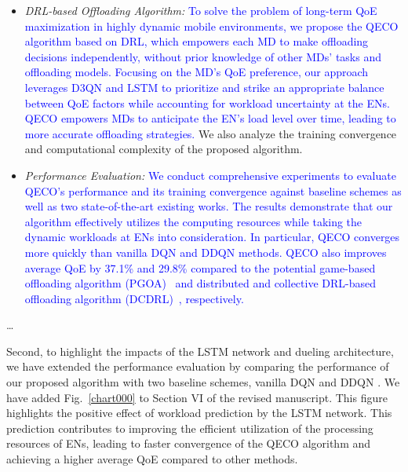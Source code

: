 \documentclass[12pt,draftclsnofoot,onecolumn]{IEEEtran}
\newenvironment{my}[2]%
{\begin{list}{}%
{\setlength{\rightmargin}{#1}\setlength{\leftmargin}{#2}}%


 \item[]{}

} {\end{list}}
\begin{document}
\begin{enumerate}
\begin{my}{1cm}{1cm}
{{\begin{itemize}
	
	\item \textit{DRL-based Offloading Algorithm:} \textcolor{blue}{To solve the problem of long-term QoE maximization in highly dynamic mobile environments, we propose the QECO algorithm based on DRL, which empowers each MD to make offloading decisions independently, without prior knowledge of other MDs' tasks and offloading models. Focusing on the MD's QoE preference, our approach leverages D3QN and LSTM to prioritize and strike an appropriate balance between QoE factors while accounting for workload uncertainty at the ENs. QECO empowers MDs to anticipate the EN's load level over time, leading to more accurate offloading strategies.} We also analyze the training convergence and computational complexity of the proposed algorithm.
	
	\item \textit{Performance Evaluation:} \textcolor{blue}{We conduct comprehensive experiments to evaluate QECO’s performance and its training convergence against baseline schemes as well as two state-of-the-art existing works. The results demonstrate that our algorithm effectively utilizes the computing resources while taking the dynamic workloads at ENs into consideration. In particular, QECO converges more quickly than vanilla DQN and DDQN methods. QECO also improves average QoE by 37.1\% and 29.8\% compared to the potential game-based offloading algorithm (PGOA)~\cite{yang2018distributed} and distributed and collective DRL-based offloading algorithm (DCDRL)~\cite{qiu2020distributed}, respectively.}
	

\end{itemize}

\dots
}}
\end{my}
\vspace{5mm}

Second, to highlight the impacts of the LSTM network and dueling architecture, we have extended the performance evaluation by comparing the performance of our proposed algorithm with two baseline schemes, vanilla DQN and DDQN \cite{van2016deep}. We have added Fig.~\ref{chart000} to Section VI of the revised manuscript.
This figure highlights the positive effect of workload prediction by the LSTM network. This prediction contributes to improving the efficient utilization of the processing resources of ENs, leading to faster convergence of the QECO algorithm and achieving a higher average QoE compared to other methods. 

 




\end{enumerate}
\end{document}
